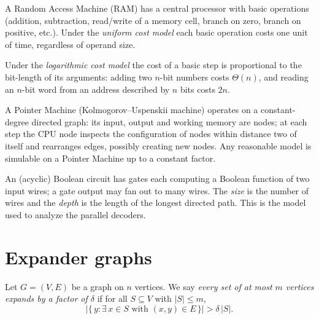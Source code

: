 \begin{definition}
  \label{def:ram-uniform}
  A Random Access Machine (RAM) has a central processor with basic operations
  (addition, subtraction, read/write of a memory cell, branch on zero, branch
  on positive, etc.). Under the \emph{uniform cost model} each basic operation
  costs one unit of time, regardless of operand size.
\end{definition}

\begin{definition}
  \label{def:ram-log}
  Under the \emph{logarithmic cost model} the cost of a basic step is
  proportional to the bit-length of its arguments: adding two $n$-bit numbers
  costs $\Theta(n)$, and reading an $n$-bit word from an address described by
  $n$ bits costs $2n$.
\end{definition}

\begin{definition}
  \label{def:pointer-machine}
  A Pointer Machine (Kolmogorov--Uspenskii machine) operates on a
  constant-degree directed graph: its input, output and working memory are
  nodes; at each step the CPU node inspects the configuration of nodes within
  distance two of itself and rearranges edges, possibly creating new nodes.
  Any reasonable model is simulable on a Pointer Machine up to a constant
  factor.
\end{definition}

\begin{definition}
  \label{def:circuit}
  An (acyclic) Boolean circuit has gates each computing a Boolean function of
  two input wires; a gate output may fan out to many wires. The \emph{size} is
  the number of wires and the \emph{depth} is the length of the longest
  directed path. This is the model used to analyze the parallel decoders.
\end{definition}

\chapter{Expander graphs}


\begin{definition}
  \label{def:expansion-factor}
  Let $G=(V,E)$ be a graph on $n$ vertices. We say \emph{every set of at most
  $m$ vertices expands by a factor of $\delta$} if for all $S \subseteq V$ with
  $|S| \le m$,
  \[
    \bigl|\{\,y : \exists\, x \in S \text{ with } (x,y)\in E\,\}\bigr| > \delta\,|S|.
  \]
\end{definition}

